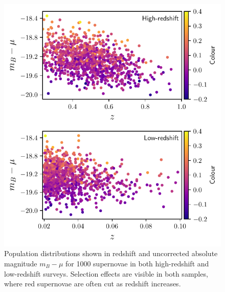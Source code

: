 \documentclass[a4paper,fleqn,usenatbib]{mnras}
\begin{document}
\begin{figure}
	\begin{center}
		\includegraphics[width=\columnwidth]{plot_pop_simple.pdf}
	\end{center}
	\caption{Population distributions shown in redshift and uncorrected absolute magnitude $m_B - \mu$ for 1000 supernovae in both high-redshift and low-redshift surveys. Selection effects are visible in both samples, where red supernovae are often cut as redshift increases.}
	\label{fig:simple_pop}
\end{figure}
\end{document}
